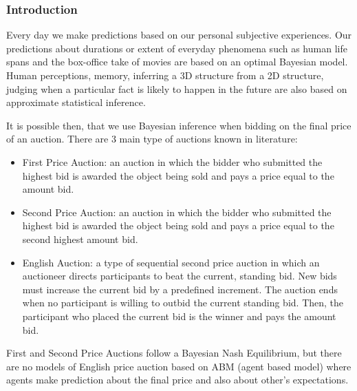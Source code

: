 

\subsubsection{Introduction}
Every day we make predictions based on our personal subjective experiences.
Our predictions about durations or extent of everyday phenomena such as human
 life spans and the box-office take of movies are based on an optimal
Bayesian model\citep{OptimalPredEveryDay}.
Human perceptions, memory, inferring a 3D structure from a 2D structure,
judging when a particular fact is likely to happen in the future are also
 based on approximate statistical inference.

It is possible then, that we use Bayesian inference when bidding on the final
 price of an auction.
There are 3 main type of auctions known in literature\citep{AuctionTypes}:
\begin{itemize}
 \item First Price Auction: an auction in which the bidder who submitted the
 highest bid is awarded the object being sold and pays a price equal to the amount bid.

 \item Second Price Auction: an auction in which the bidder who submitted the
 highest bid is awarded the object being sold and pays a price equal to the second highest amount bid.

 \item English Auction: a type of sequential second price auction  in which an
 auctioneer directs participants to beat the current, standing bid. New bids must
 increase the current bid by a predefined increment. The auction ends when no
 participant is willing to outbid the current standing bid. Then, the participant
 who placed the current bid is the winner and pays the amount bid.
\end{itemize}
% 
First and Second Price Auctions follow a Bayesian Nash Equilibrium, but there are
 no models of English price auction based on ABM (agent based model) where agents
 make prediction about the final price and also about other's expectations.


